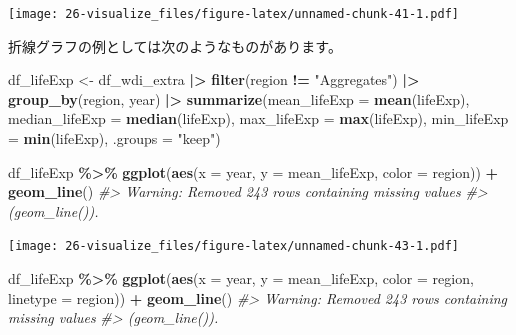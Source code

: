 \documentclass[
  xelatex, ja=standard]{bxjsbook}
\newenvironment{Shaded}{\begin{snugshade}}{\end{snugshade}}
\newcommand{\AttributeTok}[1]{\textcolor[rgb]{0.13,0.29,0.53}{#1}}
\newcommand{\CommentTok}[1]{\textcolor[rgb]{0.56,0.35,0.01}{\textit{#1}}}
\newcommand{\FunctionTok}[1]{\textcolor[rgb]{0.13,0.29,0.53}{\textbf{#1}}}
\newcommand{\NormalTok}[1]{#1}
\newcommand{\OtherTok}[1]{\textcolor[rgb]{0.56,0.35,0.01}{#1}}
\newcommand{\SpecialCharTok}[1]{\textcolor[rgb]{0.81,0.36,0.00}{\textbf{#1}}}
\newcommand{\StringTok}[1]{\textcolor[rgb]{0.31,0.60,0.02}{#1}}
\theoremstyle{definition}
\theoremstyle{definition}
\theoremstyle{definition}
\theoremstyle{definition}
\theoremstyle{remark}
\begin{document}
\texttt{[image: 26-visualize\_files/figure-latex/unnamed-chunk-41-1.pdf]}

折線グラフの例としては次のようなものがあります。

\begin{Shaded}
\begin{Highlighting}[]
\NormalTok{df\_lifeExp }\OtherTok{\textless{}{-}}\NormalTok{ df\_wdi\_extra }\SpecialCharTok{|\textgreater{}} \FunctionTok{filter}\NormalTok{(region }\SpecialCharTok{!=} \StringTok{"Aggregates"}\NormalTok{) }\SpecialCharTok{|\textgreater{}}  
  \FunctionTok{group\_by}\NormalTok{(region, year) }\SpecialCharTok{|\textgreater{}}
  \FunctionTok{summarize}\NormalTok{(}\AttributeTok{mean\_lifeExp =} \FunctionTok{mean}\NormalTok{(lifeExp), }\AttributeTok{median\_lifeExp =} \FunctionTok{median}\NormalTok{(lifeExp), }\AttributeTok{max\_lifeExp =} \FunctionTok{max}\NormalTok{(lifeExp), }\AttributeTok{min\_lifeExp =} \FunctionTok{min}\NormalTok{(lifeExp), }\AttributeTok{.groups =} \StringTok{"keep"}\NormalTok{)}
\end{Highlighting}
\end{Shaded}

\begin{Shaded}
\begin{Highlighting}[]
\NormalTok{df\_lifeExp }\SpecialCharTok{\%\textgreater{}\%} \FunctionTok{ggplot}\NormalTok{(}\FunctionTok{aes}\NormalTok{(}\AttributeTok{x =}\NormalTok{ year, }\AttributeTok{y =}\NormalTok{ mean\_lifeExp, }\AttributeTok{color =}\NormalTok{ region)) }\SpecialCharTok{+}
  \FunctionTok{geom\_line}\NormalTok{()}
\CommentTok{\#\textgreater{} Warning: Removed 243 rows containing missing values}
\CommentTok{\#\textgreater{} (\textasciigrave{}geom\_line()\textasciigrave{}).}
\end{Highlighting}
\end{Shaded}

\texttt{[image: 26-visualize\_files/figure-latex/unnamed-chunk-43-1.pdf]}

\begin{Shaded}
\begin{Highlighting}[]
\NormalTok{df\_lifeExp }\SpecialCharTok{\%\textgreater{}\%} \FunctionTok{ggplot}\NormalTok{(}\FunctionTok{aes}\NormalTok{(}\AttributeTok{x =}\NormalTok{ year, }\AttributeTok{y =}\NormalTok{ mean\_lifeExp, }\AttributeTok{color =}\NormalTok{ region, }\AttributeTok{linetype =}\NormalTok{ region)) }\SpecialCharTok{+}
  \FunctionTok{geom\_line}\NormalTok{()}
\CommentTok{\#\textgreater{} Warning: Removed 243 rows containing missing values}
\CommentTok{\#\textgreater{} (\textasciigrave{}geom\_line()\textasciigrave{}).}
\end{Highlighting}
\end{Shaded}
\end{document}
